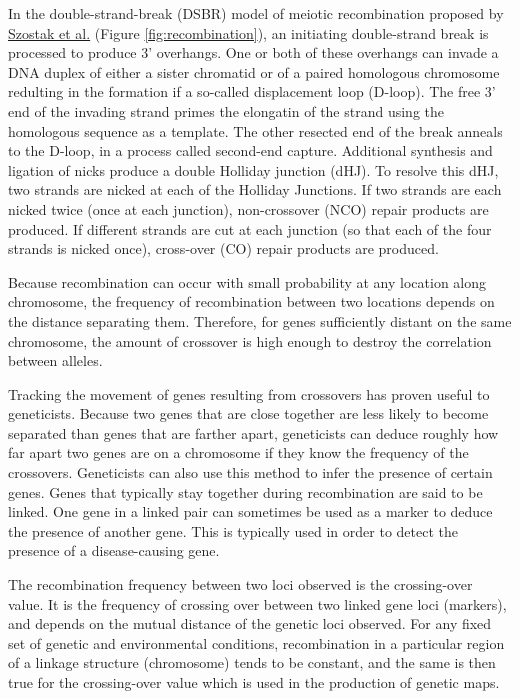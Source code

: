 In the double-strand-break (DSBR) model of meiotic recombination proposed by \href{https://www.ncbi.nlm.nih.gov/pubmed/6380756}{Szostak et al.} (Figure \ref{fig:recombination}), an initiating double-strand break is processed to produce 3' overhangs. One or both of these overhangs can invade a DNA duplex of either a sister chromatid or of a paired homologous chromosome redulting in the formation if a so-called displacement loop (D-loop). The free 3' end of the invading strand primes the elongatin of the strand using the homologous sequence as a template. The other resected end of the break anneals to the D-loop, in a process called second-end capture. Additional synthesis and ligation of nicks produce a double Holliday junction (dHJ). To resolve this dHJ, two strands are nicked at each of the Holliday Junctions. If two strands are each nicked twice (once at each junction), non-crossover (NCO) repair products are produced. If different strands are cut at each junction (so that each of the four strands is nicked once), cross-over (CO) repair products are produced.

Because recombination can occur with small probability at any location along chromosome, the frequency of recombination between two locations depends on the distance separating them. Therefore, for genes sufficiently distant on the same chromosome, the amount of crossover is high enough to destroy the correlation between alleles.

Tracking the movement of genes resulting from crossovers has proven useful to geneticists. Because two genes that are close together are less likely to become separated than genes that are farther apart, geneticists can deduce roughly how far apart two genes are on a chromosome if they know the frequency of the crossovers. Geneticists can also use this method to infer the presence of certain genes. Genes that typically stay together during recombination are said to be linked. One gene in a linked pair can sometimes be used as a marker to deduce the presence of another gene. This is typically used in order to detect the presence of a disease-causing gene.

The recombination frequency between two loci observed is the crossing-over value. It is the frequency of crossing over between two linked gene loci (markers), and depends on the mutual distance of the genetic loci observed. For any fixed set of genetic and environmental conditions, recombination in a particular region of a linkage structure (chromosome) tends to be constant, and the same is then true for the crossing-over value which is used in the production of genetic maps.

